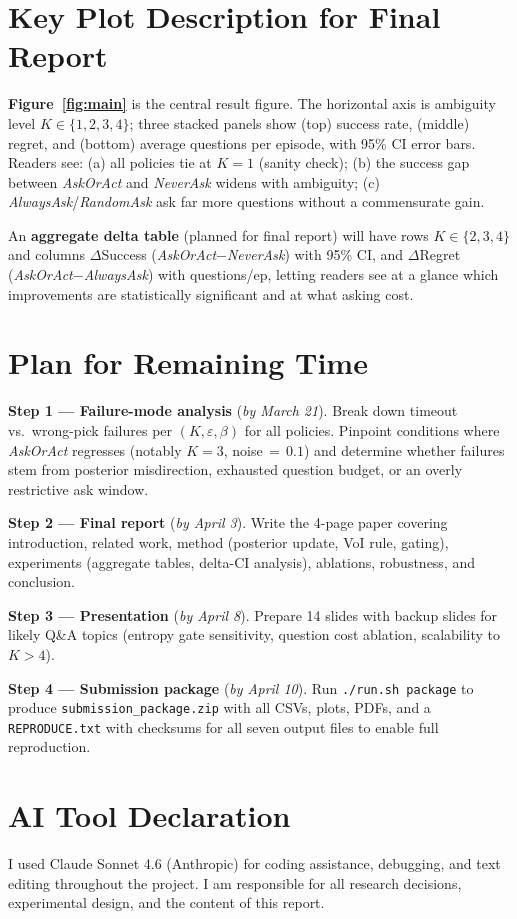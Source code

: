 \documentclass[10pt,twocolumn]{article}
\begin{document}
\section*{Key Plot Description for Final Report}

\textbf{Figure~\ref{fig:main}} is the central result figure.
The horizontal axis is ambiguity level $K \in \{1,2,3,4\}$; three stacked panels show (top) success rate, (middle) regret, and (bottom) average questions per episode, with 95\% CI error bars.
Readers see: (a) all policies tie at $K{=}1$ (sanity check); (b) the success gap between \textit{AskOrAct} and \textit{NeverAsk} widens with ambiguity; (c) \textit{AlwaysAsk}/\textit{RandomAsk} ask far more questions without a commensurate gain.

An \textbf{aggregate delta table} (planned for final report) will have rows $K \in \{2,3,4\}$ and columns $\Delta$Success (\textit{AskOrAct}$-$\textit{NeverAsk}) with 95\% CI, and $\Delta$Regret (\textit{AskOrAct}$-$\textit{AlwaysAsk}) with questions/ep, letting readers see at a glance which improvements are statistically significant and at what asking cost.

\section*{Plan for Remaining Time}

\textbf{Step 1 --- Failure-mode analysis} (\textit{by March 21}).
Break down timeout vs.\ wrong-pick failures per $(K,\varepsilon,\beta)$ for all policies.
Pinpoint conditions where \textit{AskOrAct} regresses (notably $K{=}3$, noise$\,{=}\,0.1$) and determine whether failures stem from posterior misdirection, exhausted question budget, or an overly restrictive ask window.

\textbf{Step 2 --- Final report} (\textit{by April 3}).
Write the 4-page paper covering introduction, related work, method (posterior update, VoI rule, gating), experiments (aggregate tables, delta-CI analysis), ablations, robustness, and conclusion.

\textbf{Step 3 --- Presentation} (\textit{by April 8}).
Prepare 14 slides with backup slides for likely Q\&A topics (entropy gate sensitivity, question cost ablation, scalability to $K{>}4$).

\textbf{Step 4 --- Submission package} (\textit{by April 10}).
Run \texttt{./run.sh package} to produce \texttt{submission\_package.zip} with all CSVs, plots, PDFs, and a \texttt{REPRODUCE.txt} with checksums for all seven output files to enable full reproduction.

\section*{AI Tool Declaration}
I used Claude Sonnet 4.6 (Anthropic) for coding assistance, debugging, and text editing throughout the project.
I am responsible for all research decisions, experimental design, and the content of this report.



\end{document}
